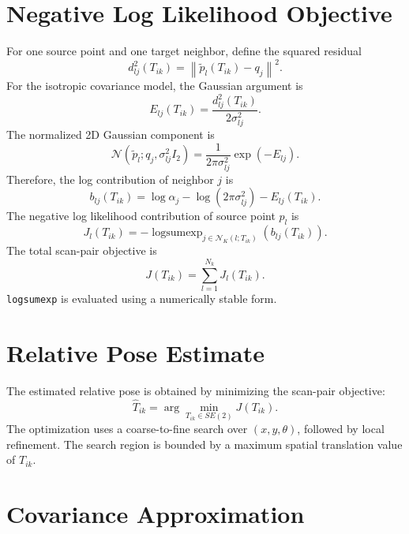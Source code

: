 \documentclass[11pt]{article}
\begin{document}
\section{Negative Log Likelihood Objective}

For one source point and one target neighbor, define the squared residual
\begin{equation}
d_{lj}^2(T_{ik}) = \left\|\tilde p_l(T_{ik}) - q_j\right\|^2.
\end{equation}
For the isotropic covariance model, the Gaussian argument is
\begin{equation}
E_{lj}(T_{ik}) = \frac{d_{lj}^2(T_{ik})}{2\sigma_{lj}^2}.
\end{equation}
The normalized 2D Gaussian component is
\begin{equation}
\mathcal{N}\left(\tilde p_l; q_j, \sigma_{lj}^2 I_2\right)
=
\frac{1}{2\pi\sigma_{lj}^2}
\exp\left(-E_{lj}\right).
\end{equation}
Therefore, the log contribution of neighbor $j$ is
\begin{equation}
b_{lj}(T_{ik}) =
\log\alpha_j
-
\log\left(2\pi\sigma_{lj}^2\right)
-
E_{lj}(T_{ik}).
\end{equation}
The negative log likelihood contribution of source point $p_l$ is
\begin{equation}
J_l(T_{ik}) =
-\operatorname{logsumexp}_{j \in \mathcal{N}_K(l;T_{ik})}
\left(b_{lj}(T_{ik})\right).
\end{equation}
The total scan-pair objective is
\begin{equation}
J(T_{ik}) = \sum_{l=1}^{N_k} J_l(T_{ik}).
\end{equation}
\texttt{logsumexp} is evaluated using a numerically stable form.

\section{Relative Pose Estimate}

The estimated relative pose is obtained by minimizing the scan-pair objective:
\begin{equation}
\hat T_{ik} = \arg\min_{T_{ik} \in SE(2)} J(T_{ik}).
\end{equation}
The optimization uses a coarse-to-fine search over $(x,y,\theta)$, followed by local refinement. The search region is bounded by a maximum spatial translation value of $T_{ik}$.

\section{Covariance Approximation}
\end{document}
